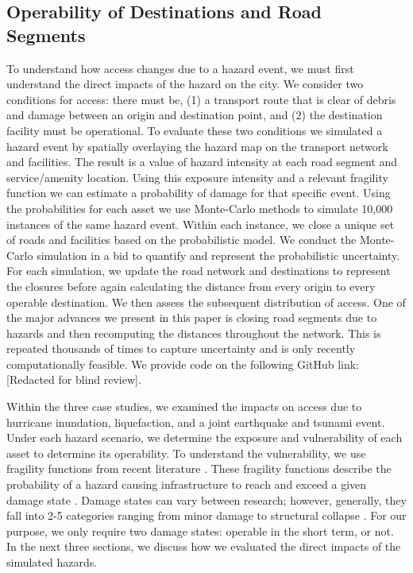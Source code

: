 \documentclass[review,3p,times,onecolumn,sort&compress,12pt]{elsarticle}
\let \cite \parencite
\begin{document}
\subsection{Operability of Destinations and Road Segments}
To understand how access changes due to a hazard event, we must first understand the direct impacts of the hazard on the city.
We consider two conditions for access: there must be, (1) a transport route that is clear of debris and damage between an origin and destination point, and (2) the destination facility must be operational.
To evaluate these two conditions we simulated a hazard event by spatially overlaying the hazard map on the transport network and facilities.
The result is a value of hazard intensity at each road segment and service/amenity location.
Using this exposure intensity and a relevant fragility function we can estimate a probability of damage for that specific event.
Using the probabilities for each asset we use Monte-Carlo methods to simulate 10,000 instances of the same hazard event.
Within each instance, we close a unique set of roads and facilities based on the probabilistic model.
We conduct the Monte-Carlo simulation in a bid to quantify and represent the probabilistic uncertainty. 
For each simulation, we update the road network and destinations to represent the closures before again calculating the distance from every origin to every operable destination.
We then assess the subsequent distribution of access.
One of the major advances we present in this paper is closing road segments due to hazards and then recomputing the distances throughout the network.
This is repeated thousands of times to capture uncertainty and is only recently computationally feasible.
We provide code on the following GitHub link: [Redacted for blind review].

Within the three case studies, we examined the impacts on access due to hurricane inundation, liquefaction, and a joint earthquake and tsunami event.
Under each hazard scenario, we determine the exposure and vulnerability of each asset to determine its operability.
To understand the vulnerability, we use fragility functions from recent literature \cite{suppasri2013building, williams2020tsunami, Wang_Chaofeng2021-jc, lin2018empirical, Pregnolato2017-gn, Nofal2020-ti}.
These fragility functions describe the probability of a hazard causing infrastructure to reach and exceed a given damage state \cite{charvet2014empirical,lin2018empirical}.
Damage states can vary between research; however, generally, they fall into 2-5 categories ranging from minor damage to structural collapse \cite{lin2018empirical,suppasri2013building}. 
For our purpose, we only require two damage states: operable in the short term, or not. 
In the next three sections, we discuss how we evaluated the direct impacts of the simulated hazards.
\end{document}
